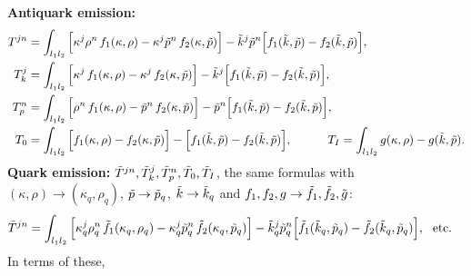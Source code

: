 \documentclass[9pt]{article}
\numberwithin{equation}{section}
\begin{document}
\noindent\textbf{Antiquark emission:}
\begin{align}\label{eq:Tqb}
T^{jn} & = \int_{l_{1}l_{2}}\Big[\kappa^{j}\rho^{n}\,f_{1}(\kappa,\rho)-\kappa^{j}\Tilde{p}^{n}\,f_{2}(\kappa,\Tilde{p})\Big]-\Tilde{k}^{j}\Tilde{p}^{n}\Big[f_{1}(\Tilde{k},\Tilde{p})-f_{2}(\Tilde{k},\Tilde{p})\Big],\notag \\
T^{j}_{k} & = \int_{l_{1}l_{2}}\Big[\kappa^{j}\,f_{1}(\kappa,\rho)-\kappa^{j}\,f_{2}(\kappa,\Tilde{p})\Big]-\Tilde{k}^{j}\Big[f_{1}(\Tilde{k},\Tilde{p})-f_{2}(\Tilde{k},\Tilde{p})\Big],\notag \\
T^{n}_{p} & = \int_{l_{1}l_{2}}\Big[\rho^{n}\,f_{1}(\kappa,\rho)-\Tilde{p}^{n}\,f_{2}(\kappa,\Tilde{p})\Big]-\Tilde{p}^{n}\Big[f_{1}(\Tilde{k},\Tilde{p})-f_{2}(\Tilde{k},\Tilde{p})\Big],\notag \\
T_{0} & = \int_{l_{1}l_{2}}\Big[f_{1}(\kappa,\rho)-f_{2}(\kappa,\Tilde{p})\Big]-\Big[f_{1}(\Tilde{k},\Tilde{p})-f_{2}(\Tilde{k},\Tilde{p})\Big],\hspace{3em} T_{I} = \int_{l_{1}l_{2}}g(\kappa,\rho)-g(\Tilde{k},\Tilde{p}).
\end{align}
\textbf{Quark emission:} $\Tilde{T}^{jn},\Tilde{T}^{j}_{k},\Tilde{T}^{n}_{p},\Tilde{T}_{0},\Tilde{T}_{I}$, the same formulas with $(\kappa,\rho)\rightarrow(\kappa_{q},\rho_{q})$, $\Tilde{p}\rightarrow\Tilde{p}_{q}$, $\Tilde{k}\rightarrow\Tilde{k}_{q}$ and $f_{1},f_{2},g\rightarrow\Tilde{f}_{1},\Tilde{f}_{2},\Tilde{g}$:
\begin{align}\label{eq:Tq}
\Tilde{T}^{jn} & = \int_{l_{1}l_{2}}\Big[\kappa^{j}_{q}\rho^{n}_{q}\,\Tilde{f}_{1}(\kappa_{q},\rho_{q})-\kappa^{j}_{q}\Tilde{p}^{n}_{q}\,\Tilde{f}_{2}(\kappa_{q},\Tilde{p}_{q})\Big]-\Tilde{k}^{j}_{q}\Tilde{p}^{n}_{q}\Big[\Tilde{f}_{1}(\Tilde{k}_{q},\Tilde{p}_{q})-\Tilde{f}_{2}(\Tilde{k}_{q},\Tilde{p}_{q})\Big],\ \ \text{etc.}
\end{align}
In terms of these,
\end{document}
